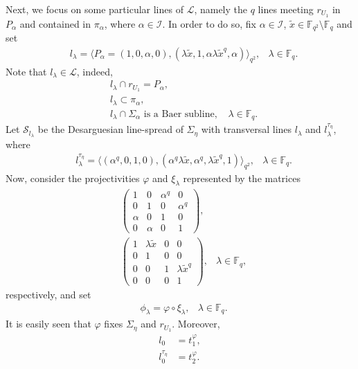 \documentclass[11pt]{article}
\theoremstyle{definition}
\numberwithin{equation}{section}
\def\cI{\mathcal I}
\def\cL{\mathcal L}
\def\cS{\mathcal S}
\def\F{{\mathbb F}}
\begin{document}
Next, we focus on some particular lines of $\cL$, namely the $q$ lines meeting $r_{U_1}$ in $P_{\alpha}$ and contained in $\pi_{\alpha}$, where $\alpha \in \cI$. In order to do so, fix $\alpha \in \cI$, $\tilde{x} \in \F_{q^2} \setminus \F_q$ and set 
\begin{align*}
& l_\lambda = \langle P_{\alpha} = (1,0, \alpha, 0), (\lambda \tilde{x}, 1, \alpha \lambda \tilde{x}^q, \alpha) \rangle_{q^2}, & \lambda \in \F_q.
\end{align*}
Note that $l_\lambda \in \cL$, indeed, 
\begin{align*}
& l_\lambda \cap r_{U_1} = P_{\alpha}, \\
& l_\lambda \subset \pi_{\alpha}, \\ 
& l_\lambda \cap \Sigma_{\alpha} \mbox{ is a Baer subline, } & \lambda \in \F_q.
\end{align*}
 Let $\cS_{l_\lambda}$ be the Desarguesian line-spread of $\Sigma_{\eta}$ with transversal lines $l_\lambda$ and $l_\lambda^{\tau_{\eta}}$, where
\begin{align*}
& l_\lambda^{\tau_{\eta}} = \langle (\alpha^q, 0, 1, 0), (\alpha^q \lambda \tilde{x}, \alpha^q, \lambda \tilde{x}^q, 1) \rangle_{q^2}, & \lambda \in \F_q. 
\end{align*}
Now, consider the projectivities $\varphi$ and $\xi_{\lambda}$ represented by the matrices
\begin{align*}
& \begin{pmatrix}
1 & 0 & \alpha^q & 0 \\
0 & 1 & 0 & \alpha^q \\
\alpha & 0 & 1 & 0 \\
0 & \alpha & 0 & 1
\end{pmatrix}, \\
& \begin{pmatrix}
1 & \lambda \tilde{x} & 0 & 0 \\
0 & 1 & 0 & 0 \\
0 & 0 & 1 & \lambda \tilde{x}^q \\
0 & 0 & 0 & 1
\end{pmatrix}, & \lambda \in \F_q,
\end{align*}
respectively, and set 
\begin{align*}
& \phi_{\lambda} = \varphi \circ \xi_{\lambda}, & \lambda \in \F_q.
\end{align*}
It is easily seen that $\varphi$ fixes $\Sigma_{\eta}$ and $r_{U_1}$. Moreover, 
\begin{align*}
 l_0 & = t_1^\varphi, \\
 l_0^{\tau_{\eta}} & = t_2^\varphi. 
\end{align*}
\end{document}
